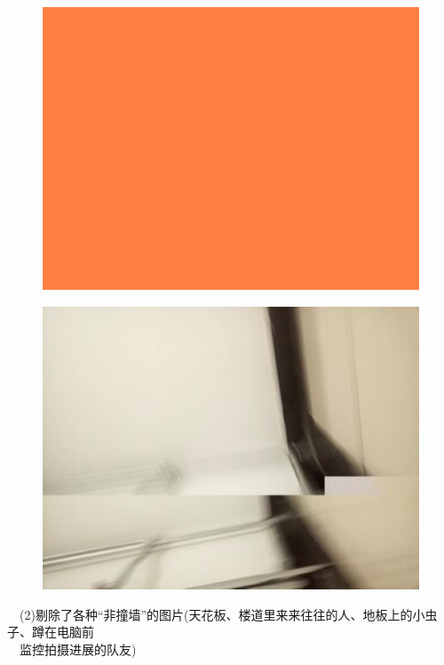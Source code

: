 \documentclass[19pt,a4paper]{article}
\begin{document}
\begin{figure}[H]
 \centering
 \includegraphics[scale=0.4]{2.png}
\end{figure}
\begin{figure}[H]
 \centering
 \includegraphics[scale=0.4]{1.png}
\end{figure}
\indent\ \ (2)剔除了各种“非撞墙”的图片(天花板、楼道里来来往往的人、地板上的小虫子、蹲在电脑前\\
\indent\ \ 监控拍摄进展的队友)\\
\end{document}
